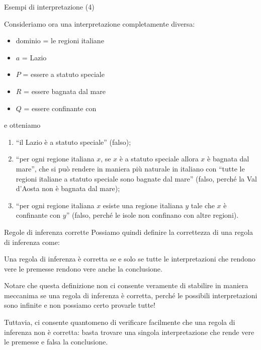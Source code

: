 \documentclass[aspectratio=169,10pt,dvipsnames,xcolor=table]{beamer}
\begin{document}
\begin{frame}{Esempi di interpretazione (4)}
    \begin{example}
        Consideriamo ora una interpretazione completamente diversa:
        \begin{itemize}
            \item dominio = le regioni italiane
            \item $a$ = Lazio
            \item $P$ = essere a statuto speciale
            \item $R$ = essere bagnata dal mare
            \item $Q$ = essere confinante con
        \end{itemize}
        e otteniamo
        \begin{enumerate}
            \item ``il Lazio è a statuto speciale'' (falso);
            \item ``per ogni regione italiana $x$, se $x$ è a statuto speciale allora $x$ è bagnata dal mare'', che si può rendere in maniera più naturale in italiano con ``tutte le regioni italiane a statuto speciale sono bagnate dal mare'' (falso, perché la Val d'Aosta non è bagnata dal mare);
            \item ``per ogni regione italiana $x$ esiste una regione italiana $y$ tale che $x$ è confinante con $y$'' (falso, perché le isole non confinano con altre regioni).
        \end{enumerate}
    \end{example}
\end{frame}

\begin{frame}{Regole di inferenza corrette}
    Possiamo quindi definire la correttezza di una regola di inferenza come:
    \begin{definition}
        Una regola di inferenza è corretta se e solo se  tutte le interpretazioni che rendono vere le premesse rendono vere anche la conclusione.
    \end{definition}

    \medskip
    Notare che questa definizione non ci consente veramente di stabilire in maniera meccanima se una regola di inferenza è corretta, perché le possibili interpretazioni sono infinite e non possiamo certo provarle tutte!

    \medskip
    Tuttavia, ci consente quantomeno di verificare facilmente che una regola di inferenza non è corretta: basta trovare una singola interpretazione che rende vere le premesse e falsa la conclusione.
\end{frame}
\end{document}

